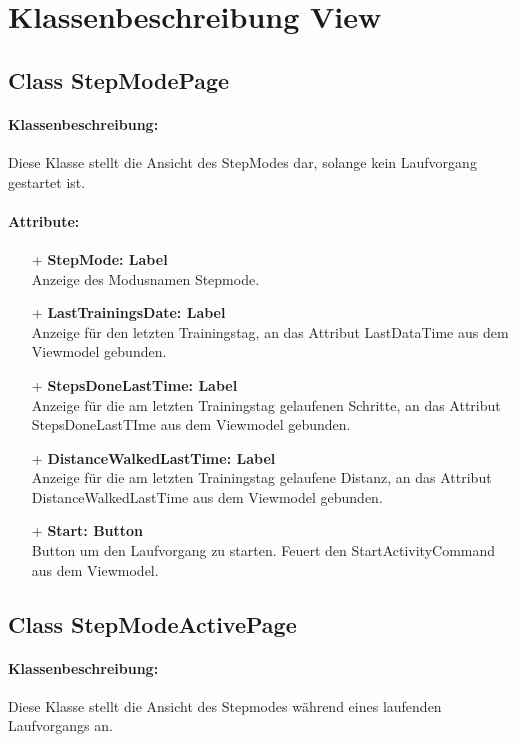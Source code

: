\documentclass[a4paper,12pt]{article}
\begin{document}
\section{Klassenbeschreibung View}
\subsection{Class StepModePage}
\paragraph{Klassenbeschreibung:}
Diese Klasse stellt die Ansicht des StepModes dar, solange kein Laufvorgang gestartet ist.
\paragraph{Attribute:}
	\begin{itemize}
	\item[+] \textbf{StepMode: Label} \\ Anzeige des Modusnamen Stepmode.
	\item[+] \textbf{LastTrainingsDate: Label} \\ Anzeige für den letzten Trainingstag, an das Attribut LastDataTime aus dem Viewmodel gebunden.
	\item[+] \textbf{StepsDoneLastTime: Label} \\ Anzeige für die am letzten Trainingstag gelaufenen Schritte, an das Attribut StepsDoneLastTIme aus dem Viewmodel gebunden.
	\item[+] \textbf{DistanceWalkedLastTime: Label} \\ Anzeige für die am letzten Trainingstag gelaufene Distanz, an das Attribut DistanceWalkedLastTime aus dem Viewmodel gebunden. 
	\item[+] \textbf{Start: Button} \\ Button um den Laufvorgang zu starten. Feuert den StartActivityCommand aus dem Viewmodel.
	\end{itemize}

\subsection{Class StepModeActivePage}
\paragraph{Klassenbeschreibung:}
Diese Klasse stellt die Ansicht des Stepmodes während eines laufenden Laufvorgangs an.
\end{document}
